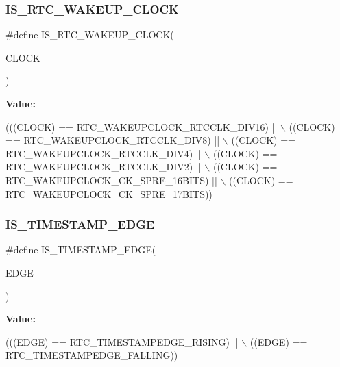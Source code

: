 \subsubsection{\texorpdfstring{I\+S\+\_\+\+R\+T\+C\+\_\+\+W\+A\+K\+E\+U\+P\+\_\+\+C\+L\+O\+CK}{IS\_RTC\_WAKEUP\_CLOCK}}
{\footnotesize\ttfamily \#define I\+S\+\_\+\+R\+T\+C\+\_\+\+W\+A\+K\+E\+U\+P\+\_\+\+C\+L\+O\+CK(\begin{DoxyParamCaption}\item[{}]{C\+L\+O\+CK }\end{DoxyParamCaption})}

{\bfseries Value\+:}
\begin{DoxyCode}
(((CLOCK) == RTC\_WAKEUPCLOCK\_RTCCLK\_DIV16)   || \(\backslash\)
                                    ((CLOCK) == RTC\_WAKEUPCLOCK\_RTCCLK\_DIV8)    || \(\backslash\)
                                    ((CLOCK) == RTC\_WAKEUPCLOCK\_RTCCLK\_DIV4)    || \(\backslash\)
                                    ((CLOCK) == RTC\_WAKEUPCLOCK\_RTCCLK\_DIV2)    || \(\backslash\)
                                    ((CLOCK) == RTC\_WAKEUPCLOCK\_CK\_SPRE\_16BITS) || \(\backslash\)
                                    ((CLOCK) == RTC\_WAKEUPCLOCK\_CK\_SPRE\_17BITS))
\end{DoxyCode}
\mbox{\label{group___r_t_c_ex___i_s___r_t_c___definitions_ga4fe0db6ab44713a1674702d867482f9a}} 
\subsubsection{\texorpdfstring{I\+S\+\_\+\+T\+I\+M\+E\+S\+T\+A\+M\+P\+\_\+\+E\+D\+GE}{IS\_TIMESTAMP\_EDGE}}
{\footnotesize\ttfamily \#define I\+S\+\_\+\+T\+I\+M\+E\+S\+T\+A\+M\+P\+\_\+\+E\+D\+GE(\begin{DoxyParamCaption}\item[{}]{E\+D\+GE }\end{DoxyParamCaption})}

{\bfseries Value\+:}
\begin{DoxyCode}
(((EDGE) == RTC\_TIMESTAMPEDGE\_RISING) || \(\backslash\)
                                 ((EDGE) == RTC\_TIMESTAMPEDGE\_FALLING))
\end{DoxyCode}
